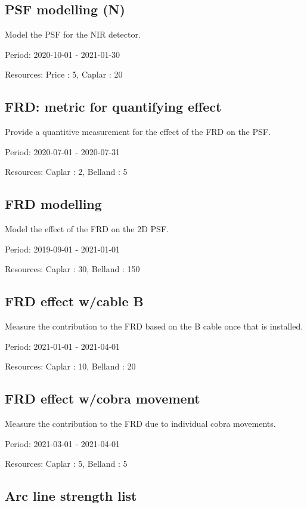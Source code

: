 \subsection{PSF modelling (N)}

Model the PSF for the NIR detector.

Period: 2020-10-01 - 2021-01-30

Resources: Price : 5, Caplar : 20

\subsection{FRD: metric for quantifying effect}

Provide a quantitive measurement for the effect of the FRD on the PSF.

Period: 2020-07-01 - 2020-07-31

Resources: Caplar : 2, Belland : 5

\subsection{FRD modelling}

Model the effect of the FRD on the 2D PSF.

Period: 2019-09-01 - 2021-01-01

Resources: Caplar : 30, Belland : 150

\subsection{FRD effect w/cable B}

Measure the contribution to the FRD based on the B cable once that is installed.

Period: 2021-01-01 - 2021-04-01

Resources: Caplar : 10, Belland : 20

\subsection{FRD effect w/cobra movement}

Measure the contribution to the FRD due to individual cobra movements.

Period: 2021-03-01 - 2021-04-01

Resources: Caplar : 5, Belland : 5

\subsection{Arc line strength list}

